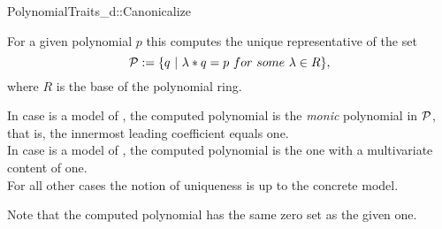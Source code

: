 \begin{ccRefConcept}{PolynomialTraits_d::Canonicalize}

\ccDefinition

For a given polynomial $p$ this  computes the 
unique representative of the set 
\[{\cal P} := \{ q\ |\ \lambda * q = p\ for\ some\ \lambda \in R  \},\]
where $R$ is the base of the polynomial ring. 

In case  is a model of 
, the computed polynomial is the {\em monic} polynomial in 
{$\cal P$}, that is, the innermost leading coefficient equals one.\\
In case  is a model 
of , the computed polynomial is the one with 
a multivariate content of one.\\
For all other cases the notion of uniqueness is up to the concrete model. 

Note that the computed polynomial has the same zero set as the given one.



\ccRefines 


\ccTypes


\ccGlue
{}

\ccOperations





\ccSeeAlso

\\
\\

\end{ccRefConcept}